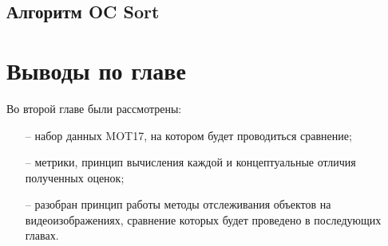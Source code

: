 \subsection{Алгоритм OC Sort}


\section{Выводы по главе}
Во второй главе были рассмотрены:
\begin{itemize}
  \item[--] набор данных MOT17, на котором будет проводиться сравнение;
  \item[--] метрики, принцип вычисления каждой и концептуальные отличия полученных оценок;
  \item[--] разобран принцип работы методы отслеживания объектов на видеоизображениях, сравнение которых будет проведено в последующих главах.  
\end{itemize}